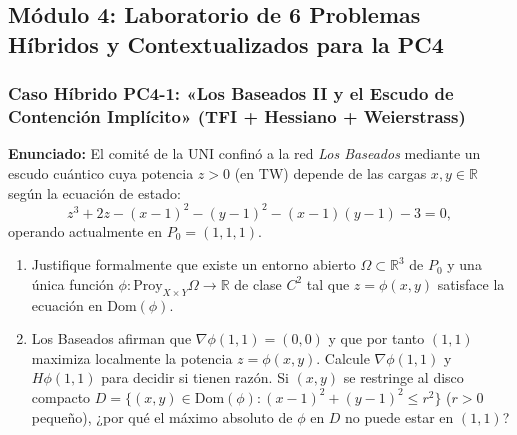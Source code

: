 \documentclass[11pt,a4paper]{article}
\begin{document}
\newpage
\subsection{Módulo 4: Laboratorio de 6 Problemas Híbridos y Contextualizados para la PC4}

\subsubsection*{Caso Híbrido PC4-1: «Los Baseados II y el Escudo de Contención Implícito» (TFI + Hessiano + Weierstrass)}
\begin{tcolorbox}[colback=white,colframe=gray!40,arc=1mm,boxrule=0.5pt]
\textbf{Enunciado:} El comité de la UNI confinó a la red \emph{Los Baseados} mediante un escudo cuántico cuya potencia $z > 0$ (en TW) depende de las cargas $x,y \in \mathbb{R}$ según la ecuación de estado:
\[ z^3 + 2z - (x-1)^2 - (y-1)^2 - (x-1)(y-1) - 3 = 0, \]
operando actualmente en $P_0 = (1,1,1)$.
\begin{enumerate}[label=\textbf{\alph*)}]
  \item Justifique formalmente que existe un entorno abierto $\Omega \subset \mathbb{R}^3$ de $P_0$ y una única función $\phi: \text{Proy}_{X\times Y}\Omega \to \mathbb{R}$ de clase $C^2$ tal que $z = \phi(x,y)$ satisface la ecuación en $\text{Dom}(\phi)$.
  \item Los Baseados afirman que $\nabla\phi(1,1)=(0,0)$ y que por tanto $(1,1)$ maximiza localmente la potencia $z = \phi(x,y)$. Calcule $\nabla\phi(1,1)$ y $H\phi(1,1)$ para decidir si tienen razón. Si $(x,y)$ se restringe al disco compacto $D = \{(x,y)\in\text{Dom}(\phi): (x-1)^2+(y-1)^2 \le r^2\}$ ($r>0$ pequeño), ¿por qué el máximo absoluto de $\phi$ en $D$ no puede estar en $(1,1)$?
\end{enumerate}
\end{tcolorbox}
\end{document}
